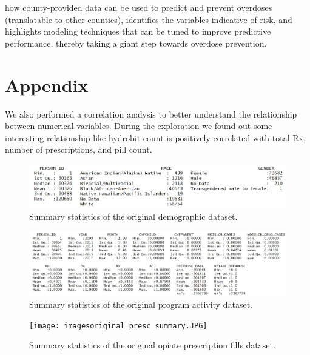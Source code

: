 \documentclass[twoside,10.5pt]{article}
\begin{document}
how county-provided data can be used to predict and prevent overdoses (translatable to other counties), identifies the variables indicative of risk, and highlights modeling techniques that can be tuned to improve predictive performance, thereby taking a giant step towards overdose prevention. 

\newpage
\appendix
\section*{Appendix}
We also performed a correlation analysis to better understand the relationship between numerical variables. During the exploration we found out some interesting relationship like hydrobit count is positively correlated with total Rx, number of prescriptions, and pill count.

\begin{figure}
\begin{center}
\includegraphics[width=5in]{images/original_dem_summary.JPG}
\end{center}
\caption{Summary statistics of the original demographic dataset.}
\label{fig:orig_dem}
\end{figure}

\begin{figure}
\begin{center}
\includegraphics[width=6in]{images/original_prog_summary.JPG}
\end{center}
\caption{Summary statistics of the original program activity dataset.}
\label{fig:orig_prog}
\end{figure}

\begin{figure}
\begin{center}
\texttt{[image: imagesoriginal\_presc\_summary.JPG]}
\end{center}
\caption{Summary statistics of the original opiate prescription fills dataset.}
\label{fig:orig_presc}
\end{figure}

\newpage
\theendnotes


\end{document}
